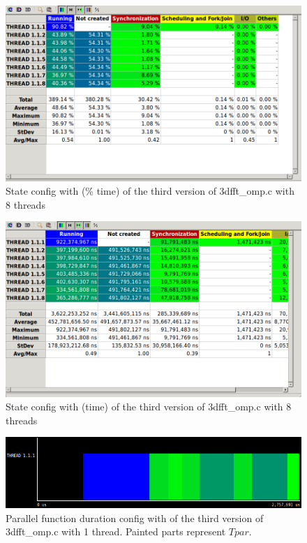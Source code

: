 \documentclass[12]{article}
\begin{document}
\begin{figure}[H]
\centering  
\includegraphics[scale=0.5]{images/megaImproved_3dfft/8threadsPercentage.PNG}
    \caption{State config with (\% time) of the third version of 3dfft\_omp.c with 8 threads}
\end{figure}

\begin{figure}[H]
\centering  
\includegraphics[scale=0.5]{images/megaImproved_3dfft/8threads.PNG}
    \caption{State config with (time) of the third version of 3dfft\_omp.c with 8 threads}
\end{figure}

\begin{figure}[H]
\centering  
\includegraphics[scale=0.5]{images/megaImproved_3dfft/parallelFunction.PNG}
    \caption{Parallel function duration config with of the third version of 3dfft\_omp.c with 1 thread. Painted parts represent $T{par}$.}
    \label{fig:parFunc3}
\end{figure}
\end{document}
